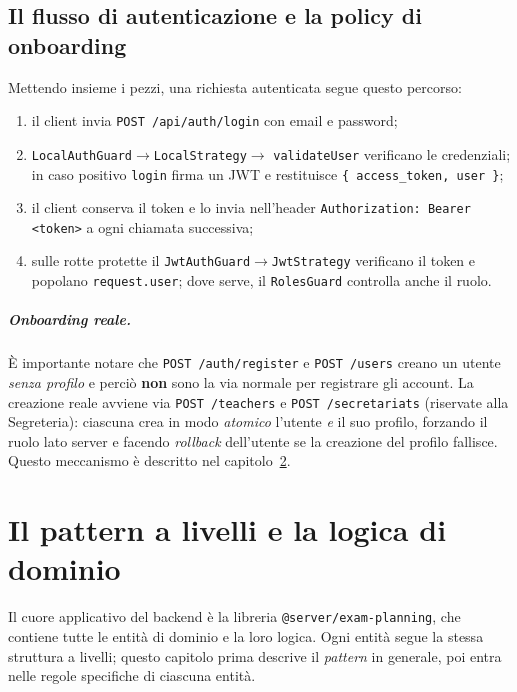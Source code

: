 \documentclass[11pt,a4paper,oneside]{report}
\newcommand{\code}[1]{\texttt{\small #1}}
\begin{document}
\section{Il flusso di autenticazione e la policy di onboarding}
Mettendo insieme i pezzi, una richiesta autenticata segue questo percorso:

\begin{enumerate}[leftmargin=1.6em]
  \item il client invia \code{POST /api/auth/login} con email e password;
  \item \code{LocalAuthGuard}$\rightarrow$\code{LocalStrategy}$\rightarrow$
        \code{validateUser} verificano le credenziali; in caso positivo
        \code{login} firma un JWT e restituisce \code{\{ access\_token, user \}};
  \item il client conserva il token e lo invia nell'header
        \code{Authorization: Bearer <token>} a ogni chiamata successiva;
  \item sulle rotte protette il \code{JwtAuthGuard}$\rightarrow$\code{JwtStrategy}
        verificano il token e popolano \code{request.user}; dove serve, il
        \code{RolesGuard} controlla anche il ruolo.
\end{enumerate}

\paragraph{Onboarding reale.} È importante notare che \code{POST /auth/register}
e \code{POST /users} creano un utente \emph{senza profilo} e perciò \textbf{non}
sono la via normale per registrare gli account. La creazione reale avviene via
\code{POST /teachers} e \code{POST /secretariats} (riservate alla Segreteria):
ciascuna crea in modo \emph{atomico} l'utente \emph{e} il suo profilo, forzando
il ruolo lato server e facendo \emph{rollback} dell'utente se la creazione del
profilo fallisce. Questo meccanismo è descritto nel capitolo~\ref{cap:dominio}.

\chapter{Il pattern a livelli e la logica di dominio}
\label{cap:dominio}

Il cuore applicativo del backend è la libreria \code{@server/exam-planning}, che
contiene tutte le entità di dominio e la loro logica. Ogni entità segue la stessa
struttura a livelli; questo capitolo prima descrive il \emph{pattern} in
generale, poi entra nelle regole specifiche di ciascuna entità.
\end{document}
